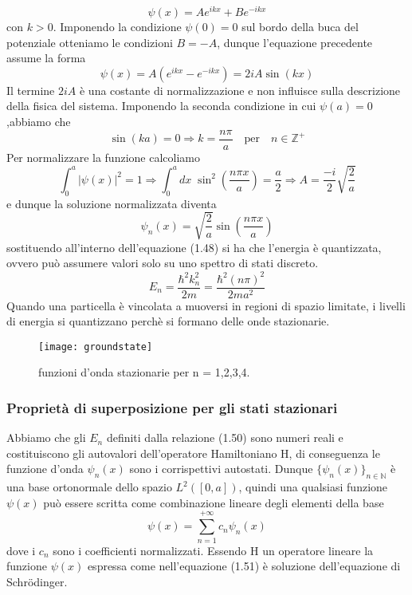  \begin{equation*}
 	\psi(x) = Ae^{ikx} + Be^{-ikx}
 \end{equation*}
con $k >0$. Imponendo la condizione $\psi(0) = 0$ sul bordo della buca del potenziale otteniamo le condizioni $B = -A$, dunque l'equazione precedente assume la forma 
\begin{equation*}
	\psi(x) = A(e^{ikx}-e^{-ikx}) = 2iA\sin(kx)
\end{equation*}
Il termine $2iA$ \`e una costante di normalizzazione e non influisce sulla descrizione della fisica del sistema. Imponendo la seconda condizione in cui $\psi(a) = 0$,abbiamo che 
\begin{equation*}
	\sin(ka) = 0 \Rightarrow k = \frac{n\pi}{a} \quad \text{per} \quad n \in \mathbb{Z}^+
\end{equation*}
 Per normalizzare la funzione calcoliamo
 \begin{equation*}
 	\int_0^a |\psi(x)|^2 = 1 \Rightarrow \int_0^a dx \; \sin^2 \left (\frac{n \pi x}{a} \right) = \frac{a}{2} \Rightarrow A = \frac{-i}{2}\sqrt{\frac{2}{a}}
 \end{equation*}
 e dunque la soluzione normalizzata diventa 
 \begin{equation}
 	\psi_n(x) = \sqrt{\frac{2}{a}}\sin\left (\frac{n \pi x}{a} \right )
 \end{equation}
 sostituendo all'interno dell'equazione (1.48) si ha che l'energia \`e quantizzata, ovvero pu\`o assumere valori solo su uno spettro di stati discreto.
 \begin{equation}
 	E_n = \frac{\hbar^2k_n^2}{2m} = \frac{\hbar^2 (n \pi)^2}{2ma^2}
 \end{equation}
 Quando una particella \`e vincolata a muoversi in regioni di spazio limitate, i livelli di energia si quantizzano perch\`e si formano delle onde stazionarie.
 
\begin{figure}[ht]
\vspace{0.1in}
\texttt{[image: groundstate]}	
\centering
\vspace{0.1in}
\caption{funzioni d'onda stazionarie per n = 1,2,3,4.}
\end{figure}

\subsubsection{Propriet\`a di superposizione per gli stati stazionari}
Abbiamo che gli $E_n$ definiti dalla relazione (1.50) sono numeri reali e costituiscono gli autovalori dell'operatore Hamiltoniano H, di conseguenza le funzione d'onda $\psi_n(x)$ sono i corrispettivi autostati. Dunque $\{\psi_n(x)\}_{n \in \mathbb{N}}$ \`e una base ortonormale dello spazio $L^2([0,a])$, quindi una qualsiasi funzione $\psi(x)$ pu\`o essere scritta come combinazione lineare degli elementi della base 
\begin{equation}
	\psi(x) = \sum_{n=1}^{+ \infty}c_n \psi_n(x)
\end{equation}
dove i $c_n$ sono i coefficienti normalizzati. Essendo H un operatore lineare la funzione $\psi(x)$ espressa come nell'equazione (1.51) \`e soluzione dell'equazione di Schr\"odinger.
\newline

